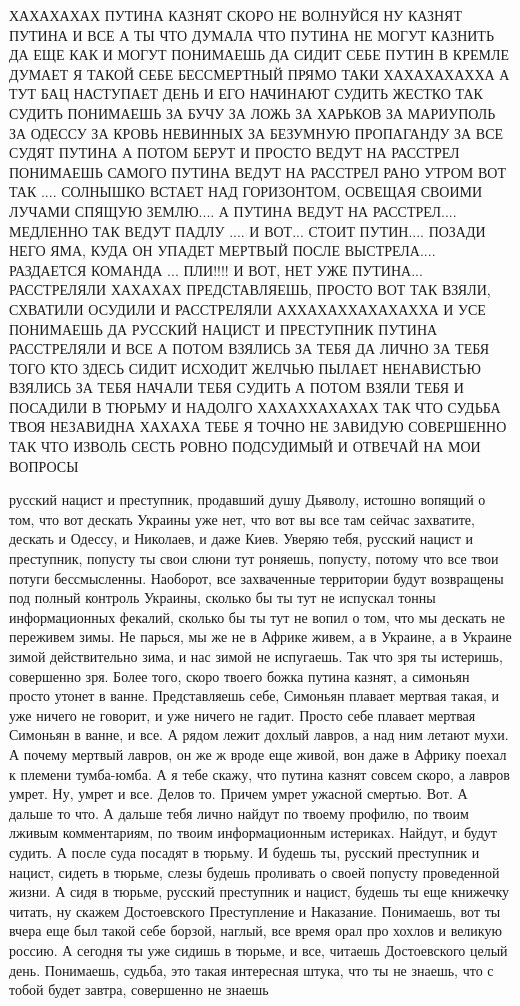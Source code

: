 ХАХАХАХАХ ПУТИНА КАЗНЯТ СКОРО НЕ ВОЛНУЙСЯ НУ КАЗНЯТ ПУТИНА И ВСЕ А ТЫ ЧТО
ДУМАЛА ЧТО ПУТИНА НЕ МОГУТ КАЗНИТЬ ДА ЕЩЕ КАК И МОГУТ ПОНИМАЕШЬ ДА СИДИТ СЕБЕ
ПУТИН В КРЕМЛЕ ДУМАЕТ Я ТАКОЙ СЕБЕ БЕССМЕРТНЫЙ ПРЯМО ТАКИ ХАХАХАХАХХА А ТУТ БАЦ
НАСТУПАЕТ ДЕНЬ И ЕГО НАЧИНАЮТ СУДИТЬ ЖЕСТКО ТАК СУДИТЬ ПОНИМАЕШЬ ЗА БУЧУ ЗА
ЛОЖЬ ЗА ХАРЬКОВ ЗА МАРИУПОЛЬ ЗА ОДЕССУ ЗА КРОВЬ НЕВИННЫХ ЗА БЕЗУМНУЮ ПРОПАГАНДУ
ЗА ВСЕ СУДЯТ ПУТИНА А ПОТОМ БЕРУТ И ПРОСТО ВЕДУТ НА РАССТРЕЛ ПОНИМАЕШЬ САМОГО
ПУТИНА ВЕДУТ НА РАССТРЕЛ РАНО УТРОМ ВОТ ТАК .... СОЛНЫШКО ВСТАЕТ НАД
ГОРИЗОНТОМ, ОСВЕЩАЯ СВОИМИ ЛУЧАМИ СПЯЩУЮ ЗЕМЛЮ.... А ПУТИНА ВЕДУТ НА
РАССТРЕЛ.... МЕДЛЕННО ТАК ВЕДУТ ПАДЛУ .... И ВОТ... СТОИТ ПУТИН.... ПОЗАДИ НЕГО
ЯМА, КУДА ОН УПАДЕТ МЕРТВЫЙ ПОСЛЕ ВЫСТРЕЛА.... РАЗДАЕТСЯ КОМАНДА ... ПЛИ!!!! И
ВОТ, НЕТ УЖЕ ПУТИНА... РАССТРЕЛЯЛИ ХАХАХАХ ПРЕДСТАВЛЯЕШЬ, ПРОСТО ВОТ ТАК ВЗЯЛИ,
СХВАТИЛИ ОСУДИЛИ И РАССТРЕЛЯЛИ АХХАХАХХАХАХАХХА И УСЕ ПОНИМАЕШЬ ДА РУССКИЙ
НАЦИСТ И ПРЕСТУПНИК ПУТИНА РАССТРЕЛЯЛИ И ВСЕ А ПОТОМ ВЗЯЛИСЬ ЗА ТЕБЯ ДА ЛИЧНО
ЗА ТЕБЯ ТОГО КТО ЗДЕСЬ СИДИТ ИСХОДИТ ЖЕЛЧЬЮ ПЫЛАЕТ НЕНАВИСТЬЮ ВЗЯЛИСЬ ЗА ТЕБЯ
НАЧАЛИ ТЕБЯ СУДИТЬ А ПОТОМ ВЗЯЛИ ТЕБЯ И ПОСАДИЛИ В ТЮРЬМУ И НАДОЛГО
ХАХАХХАХАХАХ ТАК ЧТО СУДЬБА ТВОЯ НЕЗАВИДНА ХАХАХА ТЕБЕ Я ТОЧНО НЕ ЗАВИДУЮ
СОВЕРШЕННО ТАК ЧТО ИЗВОЛЬ СЕСТЬ РОВНО ПОДСУДИМЫЙ И ОТВЕЧАЙ НА МОИ ВОПРОСЫ

русский нацист и преступник, продавший душу Дьяволу, истошно вопящий о том, 
что вот дескать Украины уже нет, что вот вы все там сейчас захватите,
дескать и Одессу, и Николаев, и даже Киев. Уверяю тебя, русский нацист и преступник,
попусту ты свои слюни тут роняешь, попусту, потому что все твои потуги бессмысленны.
Наоборот, все захваченные территории будут возвращены под полный контроль Украины,
сколько бы ты тут не испускал тонны информационных фекалий, сколько бы ты тут не вопил о том,
что мы дескать не переживем зимы. Не парься, мы же не в Африке живем, а в Украине,
а в Украине зимой действительно зима, и нас зимой не испугаешь. Так что зря ты истеришь,
совершенно зря. Более того, скоро твоего божка путина казнят, а симоньян просто утонет в ванне.
Представляешь себе, Симоньян плавает мертвая такая, и уже ничего не говорит,
и уже ничего не гадит. Просто себе плавает мертвая Симоньян в ванне, и все. А рядом лежит
дохлый лавров, а над ним летают мухи. А почему мертвый лавров, он же ж вроде
еще живой, вон даже в Африку поехал к племени тумба-юмба. А я тебе скажу, что путина казнят совсем скоро,
а лавров умрет. Ну, умрет и все. Делов то. Причем умрет ужасной смертью. Вот. А дальше то что.
А дальше тебя лично найдут по твоему профилю, по твоим лживым комментариям, по твоим
информационным истериках. Найдут, и будут судить. А после суда посадят в тюрьму. И будешь ты,
русский преступник и нацист, сидеть в тюрьме, слезы будешь проливать о своей попусту проведенной жизни.
А сидя в тюрьме, русский преступник и нацист, будешь ты еще книжечку читать, ну скажем Достоевского
Преступление и Наказание. Понимаешь, вот ты вчера еще был такой себе борзой, наглый, все время орал
про хохлов и великую россию. А сегодня ты уже сидишь в тюрьме, и все, читаешь Достоевского целый день.
Понимаешь, судьба, это такая интересная штука, что ты не знаешь, что с тобой будет завтра, совершенно 
не знаешь

